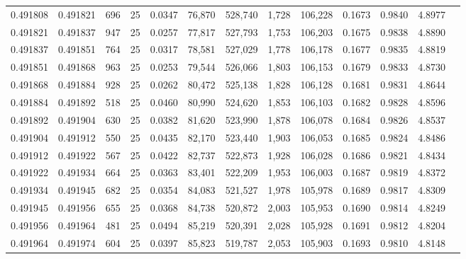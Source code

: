 \begin{tabular}{rrrrrrrrrrrrr}
0.491808 & 0.491821 &   696 &  25 &                                     0.0347 &  76,870 & 528,740 &   1,728 & 106,228 & 0.1673 & 0.9840 & 4.8977 \\
0.491821 & 0.491837 &   947 &  25 &                                     0.0257 &  77,817 & 527,793 &   1,753 & 106,203 & 0.1675 & 0.9838 & 4.8890 \\
0.491837 & 0.491851 &   764 &  25 &                                     0.0317 &  78,581 & 527,029 &   1,778 & 106,178 & 0.1677 & 0.9835 & 4.8819 \\
0.491851 & 0.491868 &   963 &  25 &                                     0.0253 &  79,544 & 526,066 &   1,803 & 106,153 & 0.1679 & 0.9833 & 4.8730 \\
0.491868 & 0.491884 &   928 &  25 &                                     0.0262 &  80,472 & 525,138 &   1,828 & 106,128 & 0.1681 & 0.9831 & 4.8644 \\
0.491884 & 0.491892 &   518 &  25 &                                     0.0460 &  80,990 & 524,620 &   1,853 & 106,103 & 0.1682 & 0.9828 & 4.8596 \\
0.491892 & 0.491904 &   630 &  25 &                                     0.0382 &  81,620 & 523,990 &   1,878 & 106,078 & 0.1684 & 0.9826 & 4.8537 \\
0.491904 & 0.491912 &   550 &  25 &                                     0.0435 &  82,170 & 523,440 &   1,903 & 106,053 & 0.1685 & 0.9824 & 4.8486 \\
0.491912 & 0.491922 &   567 &  25 &                                     0.0422 &  82,737 & 522,873 &   1,928 & 106,028 & 0.1686 & 0.9821 & 4.8434 \\
0.491922 & 0.491934 &   664 &  25 &                                     0.0363 &  83,401 & 522,209 &   1,953 & 106,003 & 0.1687 & 0.9819 & 4.8372 \\
0.491934 & 0.491945 &   682 &  25 &                                     0.0354 &  84,083 & 521,527 &   1,978 & 105,978 & 0.1689 & 0.9817 & 4.8309 \\
0.491945 & 0.491956 &   655 &  25 &                                     0.0368 &  84,738 & 520,872 &   2,003 & 105,953 & 0.1690 & 0.9814 & 4.8249 \\
0.491956 & 0.491964 &   481 &  25 &                                     0.0494 &  85,219 & 520,391 &   2,028 & 105,928 & 0.1691 & 0.9812 & 4.8204 \\
0.491964 & 0.491974 &   604 &  25 &                                     0.0397 &  85,823 & 519,787 &   2,053 & 105,903 & 0.1693 & 0.9810 & 4.8148 \\

\end{tabular}
